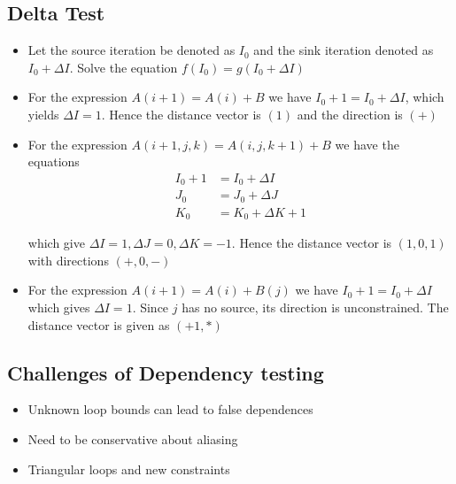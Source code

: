 \documentclass{article}
\begin{document}
\subsection{Delta Test}
\begin{itemize}
    \item Let the source iteration be denoted as $I_0$ and the sink iteration denoted as $I_0 + \Delta I$. Solve the equation $f(I_0) = g(I_0 + \Delta I)$
    
    \item For the expression $A(i+1) = A(i) + B$ we have $I_0 +1 = I_0 + \Delta I$, which yields $\Delta I = 1$. Hence the distance vector is $(1)$ and the direction is $(+)$
    
    \item For the expression $A(i+1, j, k) = A(i, j, k+1) + B$ we have the equations
    \begin{align*}
        I_0 + 1 &= I_0 + \Delta I \\
        J_0 &= J_0 + \Delta J\\
        K_0 &= K_0 + \Delta K + 1
    \end{align*}
    
    which give $\Delta I = 1, \Delta J = 0, \Delta K = -1$. Hence the distance vector is $(1, 0, 1)$ with directions $(+, 0, -)$
    
    \item For the expression $A(i+1) = A(i) + B(j)$ we have $I_0 + 1 = I_0 + \Delta I$ which gives $\Delta I = 1$. Since $j$ has no source, its direction is unconstrained. The distance vector is given as $(+1, *)$
\end{itemize}

\subsection{Challenges of Dependency testing}
\begin{itemize}
    \item Unknown loop bounds can lead to false dependences
    \item Need to be conservative about aliasing
    \item Triangular loops and new constraints
\end{itemize}
\end{document}
